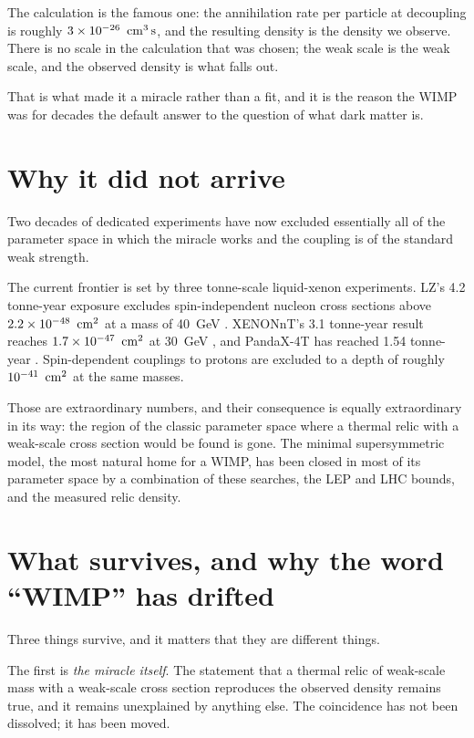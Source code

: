 The calculation is the famous one: the annihilation rate per particle at
decoupling is roughly $3 \times 10^{-26}\ \cmthree\s$, and the resulting
density is the density we observe. There is no scale in the calculation that
was chosen; the weak scale is the weak scale, and the observed density is
what falls out.

That is what made it a miracle rather than a fit, and it is the reason the
WIMP was for decades the default answer to the question of what dark matter
is.

\section{Why it did not arrive}Two decades of dedicated experiments have now excluded
essentially all of the parameter space in which the miracle works and the
coupling is of the standard weak strength.

The current frontier is set by three tonne-scale liquid-xenon experiments.
LZ's 4.2 tonne-year exposure excludes spin-independent nucleon cross
sections above $2.2 \times 10^{-48}\ \,\mathrm{cm}^{2}$ at a mass of 40~GeV
. XENONnT's 3.1 tonne-year result reaches
$1.7 \times 10^{-47}\ \cmtwo$ at 30~GeV , and
PandaX-4T has reached 1.54 tonne-year . Spin-dependent
couplings to protons are excluded to a depth of roughly $10^{-41}\ \,\mathrm{cm}^{2}$
at the same masses.

Those are extraordinary numbers, and their consequence is equally
extraordinary in its way: the region of the classic parameter space where a
thermal relic with a weak-scale cross section would be found is gone. The
minimal supersymmetric model, the most natural home for a WIMP, has been
closed in most of its parameter space by a combination of these searches, the
LEP and LHC bounds, and the measured relic density.

\section{What survives, and why the word ``WIMP'' has drifted}Three things survive, and it matters that they are
different things.

The first is \emph{the miracle itself}. The statement that a thermal relic
of weak-scale mass with a weak-scale cross section reproduces the observed
density remains true, and it remains unexplained by anything else. The
coincidence has not been dissolved; it has been moved.

